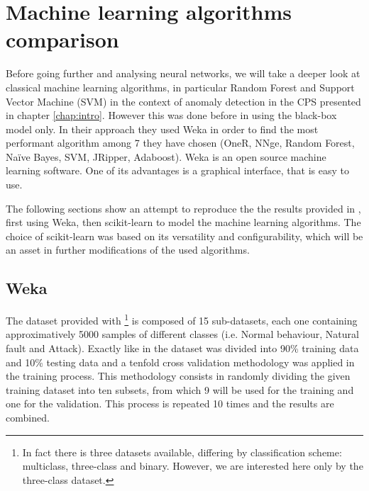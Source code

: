 \chapter{Machine learning algorithms comparison} \label{chap:methods}


Before going further and analysing neural networks, we will take a deeper look at classical machine learning algorithms, in particular Random Forest and Support Vector Machine (SVM) in the context of anomaly detection in the CPS presented in chapter \ref{chap:intro}. However this was done before in \cite{borges_hink_machine_2014-1} using the black-box model only. In their approach they used Weka \cite{witten_appendix_2017} in order to find the most performant algorithm among 7 they have chosen (OneR, NNge, Random Forest, Naïve Bayes, SVM, JRipper, Adaboost). Weka is an open source machine learning software. One of its advantages is a graphical interface, that is easy to use. 

The following sections show an attempt to reproduce the the results provided in \cite{borges_hink_machine_2014-1}, first using Weka, then scikit-learn \cite{pedregosa_scikit-learn_2011} to model the machine learning algorithms. The choice of scikit-learn was based on its versatility and configurability, which will be an asset in further modifications of the used algorithms.

\section{Weka} \label{sec:weka_in_chap:methods}
The dataset provided with \cite{adhikari_power_2014}\footnote{In fact there is three datasets available, differing by classification scheme: multiclass, three-class and binary. However, we are interested here only by the three-class dataset.} is composed of 15 sub-datasets, each one containing approximatively 5000 samples of different classes (i.e. Normal behaviour, Natural fault and Attack). Exactly like in \cite{borges_hink_machine_2014-1} the dataset was divided into 90\% training data and 10\% testing data and a tenfold cross validation methodology was applied in the training process. This methodology consists in randomly dividing the given training dataset into ten subsets, from which 9 will be used for the training and one for the validation. This process is repeated 10 times and the results are combined.  

